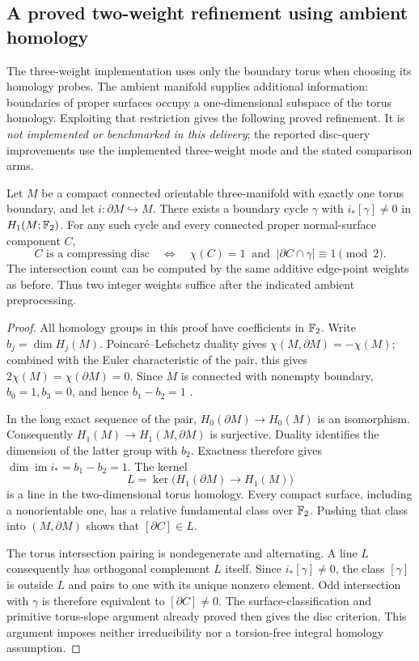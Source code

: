 \subsection{A proved two-weight refinement using ambient homology}
\label{sec:two-weight-refinement}

The three-weight implementation uses only the boundary torus when choosing
its homology probes. The ambient manifold supplies additional information:
boundaries of proper surfaces occupy a one-dimensional subspace of the
torus homology. Exploiting that restriction gives the following proved
refinement. It is \emph{not implemented or benchmarked in this delivery};
the reported disc-query improvements use the implemented three-weight mode
and the stated comparison arms.

\begin{samepage}
\begin{proposition}
\label{prop:two-weight-disc}
Let $M$ be a compact connected orientable three-manifold with exactly one
torus boundary, and let $i:\partial M\hookrightarrow M$. There exists a
boundary cycle $\gamma$ with $i_*[\gamma]\ne0$ in $H_1(M;\mathbb F_2)$. For any
such cycle and every connected proper normal-surface component $C$,
\[
 C\text{ is a compressing disc}
 \quad\Longleftrightarrow\quad
 \chi(C)=1\ \text{ and }\ |\partial C\cap\gamma|\equiv1\pmod2.
\]
The intersection count can be computed by the same additive edge-point
weights as before. Thus two integer weights suffice after the indicated
ambient preprocessing.
\end{proposition}
\end{samepage}
\begin{proof}
All homology groups in this proof have coefficients in $\mathbb F_2$. Write
$b_j=\dim H_j(M)$. Poincar\'e--Lefschetz duality gives
$\chi(M,\partial M)=-\chi(M)$; combined with the Euler characteristic of
the pair, this gives $2\chi(M)=\chi(\partial M)=0$. Since $M$ is connected
with nonempty boundary, $b_0=1,b_3=0$, and hence $b_1-b_2=1$
\cite{Hatcher2002}.

In the long exact sequence of the pair, $H_0(\partial M)\to H_0(M)$ is an
isomorphism. Consequently $H_1(M)\to H_1(M,\partial M)$ is surjective.
Duality identifies the dimension of the latter group with $b_2$. Exactness
therefore gives $\dim\operatorname{im}i_*=b_1-b_2=1$. The kernel
\[
 L=\ker\bigl(H_1(\partial M)\longrightarrow H_1(M)\bigr)
\]
is a line in the two-dimensional torus homology. Every compact surface,
including a nonorientable one, has a relative fundamental class over
$\mathbb F_2$. Pushing that class into $(M,\partial M)$ shows that
$[\partial C]\in L$.

The torus intersection pairing is nondegenerate and alternating. A line
$L$ consequently has orthogonal complement $L$ itself. Since
$i_*[\gamma]\ne0$, the class $[\gamma]$ is outside $L$ and pairs to one
with its unique nonzero element. Odd intersection with $\gamma$ is therefore
equivalent to $[\partial C]\ne0$. The surface-classification and primitive
torus-slope argument already proved then gives the disc criterion. This
argument imposes neither irreducibility nor a torsion-free integral homology
assumption.
\end{proof}

